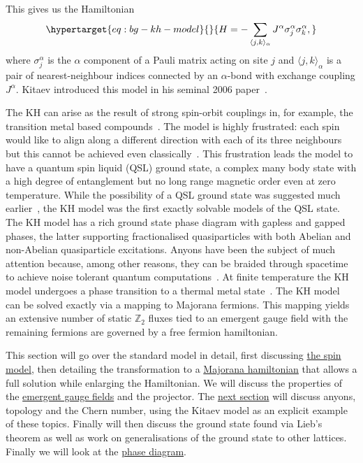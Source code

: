 This gives us the Hamiltonian \begin{equation}\protect\hypertarget{eq:bg-kh-model}{}{ H =  - \sum_{\langle j,k\rangle_\alpha} J^{\alpha}\sigma_j^{\alpha}\sigma_k^{\alpha}, }\label{eq:bg-kh-model}\end{equation} where \(\sigma^\alpha_j\) is the \(\alpha\) component of a Pauli matrix acting on site \(j\) and \(\langle j,k\rangle_\alpha\) is a pair of nearest-neighbour indices connected by an \(\alpha\)-bond with exchange coupling \(J^\alpha\). Kitaev introduced this model in his seminal 2006 paper~\autocite{kitaevAnyonsExactlySolved2006}.

The KH can arise as the result of strong spin-orbit couplings in, for example, the transition metal based compounds~\autocite{Jackeli2009,HerrmannsAnRev2018,Winter2017,TrebstPhysRep2022,Takagi2019}. The model is highly frustrated: each spin would like to align along a different direction with each of its three neighbours but this cannot be achieved even classically~\autocite{chandraClassicalHeisenbergSpins2010,selaOrderbydisorderSpinorbitalLiquids2014}. This frustration leads the model to have a quantum spin liquid (QSL) ground state, a complex many body state with a high degree of entanglement but no long range magnetic order even at zero temperature. While the possibility of a QSL ground state was suggested much earlier~\autocite{andersonResonatingValenceBonds1973}, the KH model was the first exactly solvable models of the QSL state. The KH model has a rich ground state phase diagram with gapless and gapped phases, the latter supporting fractionalised quasiparticles with both Abelian and non-Abelian quasiparticle excitations. Anyons have been the subject of much attention because, among other reasons, they can be braided through spacetime to achieve noise tolerant quantum computations~\autocite{freedmanTopologicalQuantumComputation2003}. At finite temperature the KH model undergoes a phase transition to a thermal metal state~\autocite{selfThermallyInducedMetallic2019}. The KH model can be solved exactly via a mapping to Majorana fermions. This mapping yields an extensive number of static \(\mathbb Z_2\) fluxes tied to an emergent gauge field with the remaining fermions are governed by a free fermion hamiltonian.

This section will go over the standard model in detail, first discussing \protect\hyperlink{the-spin-model}{the spin model}, then detailing the transformation to a \protect\hyperlink{the-majorana-model}{Majorana hamiltonian} that allows a full solution while enlarging the Hamiltonian. We will discuss the properties of the \protect\hyperlink{an-emergent-gauge-field}{emergent gauge fields} and the projector. The \protect\hyperlink{sec:anyons}{next section} will discuss anyons, topology and the Chern number, using the Kitaev model as an explicit example of these topics. Finally will then discuss the ground state found via Lieb's theorem as well as work on generalisations of the ground state to other lattices. Finally we will look at the \protect\hyperlink{ground-state-phases}{phase diagram}.

